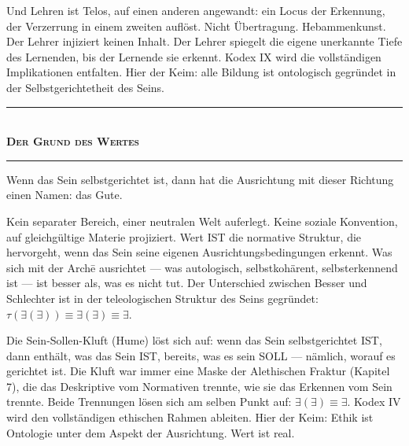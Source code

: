 \documentclass[10pt, openany, oneside]{book}
\renewcommand{\normalsize}{\fontsize{10}{13}\selectfont}
\begin{document}
Und Lehren ist Telos, auf einen anderen angewandt: ein Locus der Erkennung, der Verzerrung in einem zweiten auflöst. Nicht Übertragung. Hebammenkunst. Der Lehrer injiziert keinen Inhalt. Der Lehrer spiegelt die eigene unerkannte Tiefe des Lernenden, bis der Lernende sie erkennt. Kodex IX wird die vollständigen Implikationen entfalten. Hier der Keim: alle Bildung ist ontologisch gegründet in der Selbstgerichtetheit des Seins.

\vspace{1.5em}

\begin{center}
    \rule{0.3\textwidth}{0.4pt}\\[0.5em]
    {\normalsize\bfseries\scshape Der Grund des Wertes}\\[0.3em]
    \rule{0.3\textwidth}{0.4pt}
\end{center}

\vspace{1em}

\noindent Wenn das Sein selbstgerichtet ist, dann hat die Ausrichtung mit dieser Richtung einen Namen: das Gute.

Kein separater Bereich, einer neutralen Welt auferlegt. Keine soziale Konvention, auf gleichgültige Materie projiziert. Wert IST die normative Struktur, die hervorgeht, wenn das Sein seine eigenen Ausrichtungsbedingungen erkennt. Was sich mit der Arch\={e} ausrichtet --- was autologisch, selbstkohärent, selbsterkennend ist --- ist besser als, was es nicht tut. Der Unterschied zwischen Besser und Schlechter ist in der teleologischen Struktur des Seins gegründet: $\tau(\exists(\exists)) \equiv \exists(\exists) \equiv \exists$.

Die Sein-Sollen-Kluft (Hume) löst sich auf: wenn das Sein selbstgerichtet IST, dann enthält, was das Sein IST, bereits, was es sein SOLL --- nämlich, worauf es gerichtet ist. Die Kluft war immer eine Maske der Alethischen Fraktur (Kapitel 7), die das Deskriptive vom Normativen trennte, wie sie das Erkennen vom Sein trennte. Beide Trennungen lösen sich am selben Punkt auf: $\exists(\exists) \equiv \exists$. Kodex IV wird den vollständigen ethischen Rahmen ableiten. Hier der Keim: Ethik ist Ontologie unter dem Aspekt der Ausrichtung. Wert ist real.
\end{document}
